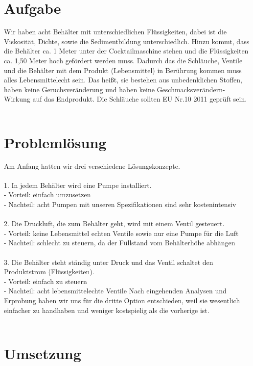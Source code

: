 \documentclass[10pt,a4paper]{report}
\begin{document}
	\section{Aufgabe}
	Wir haben acht Behälter mit unterschiedlichen Flüssigkeiten, dabei ist die Viskosität, Dichte, sowie
	die Sedimentbildung unterschiedlich. Hinzu kommt, dass die Behälter ca. 1 Meter unter der
	Cocktailmaschine stehen und die Flüssigkeiten ca. 1,50 Meter hoch gefördert werden muss.
	Dadurch das die Schläuche, Ventile und die Behälter mit dem Produkt (Lebensmittel) in Berührung
	kommen muss alles Lebensmittelecht sein. Das heißt, sie bestehen aus unbedenklichen Stoffen,
	haben keine Geruchsveränderung und haben keine Geschmacksverändern-Wirkung auf das
	Endprodukt. Die Schläuche sollten EU Nr.10 2011 geprüft sein.\\\\
	
	\section{Problemlösung}
	Am Anfang hatten wir drei verschiedene Lösungskonzepte.\\ \\
	1. In jedem Behälter wird eine Pumpe installiert.\\
	- Vorteil: einfach umzusetzen\\
	- Nachteil: acht Pumpen mit unseren Spezifikationen sind sehr kostenintensiv\\ \\
	2. Die Druckluft, die zum Behälter geht, wird mit einem Ventil gesteuert.\\
	- Vorteil: keine Lebensmittel echten Ventile sowie nur eine Pumpe für die Luft\\
	- Nachteil: schlecht zu steuern, da der Füllstand vom Behälterhöhe abhängen\\ \\
	3. Die Behälter steht ständig unter Druck und das Ventil schaltet den Produktstrom (Flüssigkeiten).\\
	- Vorteil: einfach zu steuern\\
	- Nachteil: acht lebensmittelechte Ventile
	Nach eingehenden Analysen und Erprobung haben wir uns für die dritte Option entschieden, weil
	sie wesentlich einfacher zu handhaben und weniger kostspielig als die vorherige ist. \\ \\
	\section{Umsetzung}
	
\end{document}
